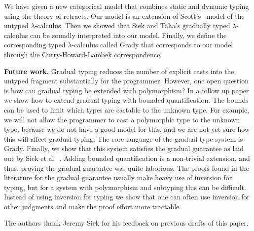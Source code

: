 We have given a new categorical model that combines static and dynamic
typing using the theory of retracts.  Our model is an extension of
Scott's~\cite{Scott:1980} model of the untyped $\lambda$-calculus.
Then we showed that Siek and Taha's gradually typed $\lambda$-calculus
\cite{Siek:2015} can be soundly interpreted into our model.  Finally,
we define the corresponding typed $\lambda$-calculus called Grady that
corresponds to our model through the Curry-Howard-Lambek
correspondence.

\textbf{Future work.}  Gradual typing reduces the number of explicit
casts into the untyped fragment substantially for the programmer.
However, one open question is how can gradual typing be extended with
polymorphism?  In a follow up paper we show how to extend gradual
typing with bounded quantification.  The bounds can be used to limit
which types are castable to the unknown type.  For example, we will
not allow the programmer to cast a polymorphic type to the unknown
type, because we do not have a good model for this, and we are not yet
sure how this will affect gradual typing.  The core language of the
gradual type system is Grady.  Finally, we show that this system
satisfies the gradual guarantee as laid out by Siek et
al.~\cite{Siek:2015}.  Adding bounded quantification is a non-trivial
extension, and thus, proving the gradual guarantee was quite
laborious. The proofs found in the literature for the gradual
guarantee usually make heavy use of inversion for typing, but for a
system with polymorphism and subtyping this can be difficult.  Instead
of using inversion for typing we show that one can often use inversion
for other judgments and make the proof effort more tractable.

\begin{ack}
  The authors thank Jeremy Siek for his feedback on previous drafts of
  this paper.
\end{ack}
